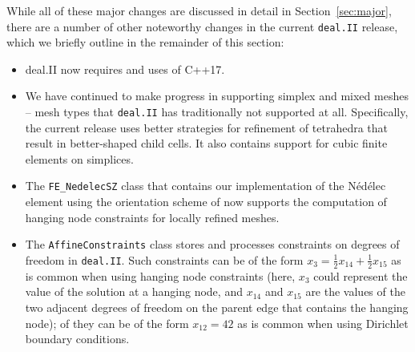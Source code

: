 \documentclass{ansarticle-preprint}
\newcommand{\specialword}[1]{\texttt{#1}}
\newcommand{\dealii}{{\specialword{deal.II}}\xspace}
\begin{document}
While all of these major changes are discussed in detail in
Section~\ref{sec:major}, there
are a number of other noteworthy changes in the current \dealii release,
which we briefly outline in the remainder of this section:
%
\begin{itemize}
  \item deal.II now requires and uses of C++17.
  \item We have continued to make progress in supporting simplex and
    mixed meshes -- mesh types that \dealii{} has traditionally not
    supported at all. Specifically, the current release uses
    better strategies for refinement of tetrahedra that result in
    better-shaped child cells. It also contains
    support for cubic finite elements on simplices.
  \item The \texttt{FE\_NedelecSZ} class that contains our
    implementation of the N\'ed\'elec element using the orientation
    scheme of \cite{Zag06} now supports the computation of hanging
    node constraints for locally refined meshes.
  \item The \texttt{AffineConstraints} class stores and processes
    constraints on degrees of freedom in \dealii{}. Such constraints
    can be of the form $x_3 = \frac 12 x_{14} + \frac 12 x_{15}$ as is
    common when using hanging node constraints (here, $x_3$ could
    represent the value of the solution at a hanging node, and $x_{14}$
    and $x_{15}$ are the values of the two adjacent degrees of freedom on
    the parent edge that contains the hanging node); of they can be of
    the form $x_{12}=42$ as is common when using Dirichlet boundary
    conditions.


\end{itemize}
\end{document}
